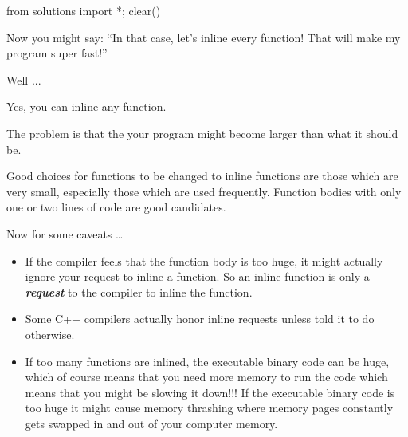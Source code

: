 \begin{python0}
from solutions import *; clear()
\end{python0}

Now you might say: ``In that case, let's inline every function! That will make my program super fast!''

Well ...

Yes, you can inline any function.

The problem is that the your program might become larger than what it should be.

Good choices for functions to be changed to inline functions are those which are very small, especially those which are used frequently. Function bodies with only one or two lines of code are good candidates.

Now for some caveats \ldots{}

\begin{itemize}
\item If the compiler feels that the function body is too huge, it might
  actually ignore your request to inline a function. So an inline
  function is only a \textbf{\textit{request}} to the compiler to inline
  the function.
\item Some C++ compilers actually honor inline requests unless told it to do
  otherwise.
\item If too many functions are inlined, the executable binary code can be
  huge, which of course means that you need more memory to run the code
  which means that you might be slowing it down!!! If the executable
  binary code is too huge it might cause memory thrashing where memory
  pages constantly gets swapped in and out of your computer memory.
\end{itemize}


